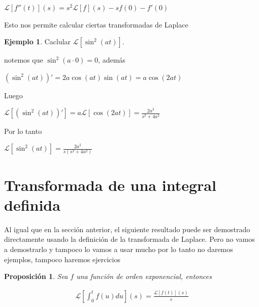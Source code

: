 \documentclass{article}
\theoremstyle{plain}
\newtheorem{prop}[thm]{Proposición}
\theoremstyle{definition}
\newtheorem{ejem}[thm]{Ejemplo}
\begin{document}
\begin{center}
$\displaystyle \mathcal{L}[f''(t)](s) = s^2\mathcal{L}[f](s)- sf(0)-f'(0)$
\end{center}

Esto nos permite calcular ciertas transformadas de Laplace \\

\begin{ejem}Caclular $\displaystyle \mathcal{L}\left[ \sin^2(at) \right] $. \\
\end{ejem}

notemos que $\sin^2(a \cdot 0) =0$, además

\begin{center}
$(\sin^2(at))' = 2a\cos(at)\sin(at) = a\cos(2at)$
\end{center}

Luego


\begin{center}
$ \displaystyle \mathcal{L}\left[ (\sin^2(at))'\right]  = a\mathcal{L}\left[ \cos(2at)\right] = \frac{2a^2}{s^2+4a^2} $
\end{center}

Por lo tanto

\begin{center}
$ \displaystyle \mathcal{L}\left[\sin^2(at)\right]  = \frac{2a^2}{s(s^2+4a^2)} $
\end{center}



\section{Transformada de una integral definida}


Al igual que en la sección anterior, el siguiente resultado puede ser demostrado directamente usando la definición de la transformada de Laplace. Pero no vamos a demostrarlo y tampoco lo vamos a usar mucho por lo tanto no daremos ejemplos, tampoco haremos ejercicios\\

\begin{prop}Sea $f$ una función de orden exponencial, entonces
\end{prop}

\begin{align*}
    \mathcal{L}\left[ \int_0^t f(u)du \right](s) = \frac{\mathcal{L}[f(t)](s)}{s}
\end{align*}
\end{document}

